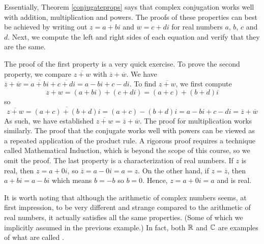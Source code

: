 \medskip

Essentially, Theorem \ref{conjugateprops} says that complex conjugation works well with addition, multiplication and powers.  The proofs of these properties can best be achieved by writing out $z = a+bi$ and $w = c+di$ for real numbers $a$, $b$, $c$ and $d$.   Next, we compute the left and right sides of each equation and verify that they are the same.  

\smallskip

The proof of the first property is a very quick exercise.  To prove the second property, we compare $\overline{z+w}$ with $\overline{z} + \overline{w}$.  We have $\overline{z} + \overline{w} = \overline{a+bi} + \overline{c+di}  = a-bi + c-di$.  To find $\overline{z+w}$, we first compute 
\[
z+w = (a+bi) + (c+di) = (a+c)+(b+d)i
\]
 so 
\[
 \overline{z+w} = \overline{(a+c)+(b+d)i} = (a+c) - (b+d)i = a - bi + c - di = \overline{z} + \overline{w}
\]  
 As such, we have established  $\overline{z+w} = \overline{z}+\overline{w}$. The proof for multiplication works similarly.  The proof that the conjugate works well with powers can be viewed as a repeated application of the product rule.  A rigorous proof requires a technique called Mathematical Induction, which is beyond the scope of this course, so we omit the proof.  The last property is a characterization of real numbers.  If $z$ is real, then $z = a + 0i$, so $\overline{z} = a - 0i = a = z$.  On the other hand, if $z=\overline{z}$, then $a+bi = a - bi$ which means $b=-b$ so $b=0$.  Hence, $z = a +0i = a$ and is real.




\medskip

It is worth noting that although the arithmetic of complex numbers seems, at first impression, to be very different and strange compared to the arithmetic of real numbers, it actually satisfies all the same properties. (Some of which we implicitly assumed in the previous example.) In fact, both $\mathbb{R}$ and $\mathbb{C}$ are examples of what are called .


